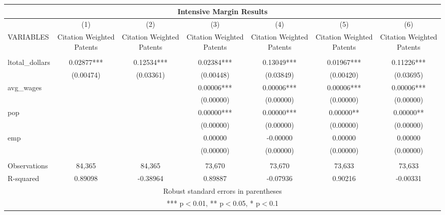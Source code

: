 \documentclass[]{article}
\begin{document}
\begin{tabular}{lcccccc}
\multicolumn{7}{c}{Intensive Margin Results} \\ \hline
 & (1) & (2) & (3) & (4) & (5) & (6) \\
VARIABLES & Citation Weighted Patents & Citation Weighted Patents & Citation Weighted Patents & Citation Weighted Patents & Citation Weighted Patents & Citation Weighted Patents \\ \hline
 &  &  &  &  &  &  \\
ltotal\_dollars & 0.02877*** & 0.12534*** & 0.02384*** & 0.13049*** & 0.01967*** & 0.11226*** \\
 & (0.00474) & (0.03361) & (0.00448) & (0.03849) & (0.00420) & (0.03695) \\
avg\_wages &  &  & 0.00006*** & 0.00006*** & 0.00006*** & 0.00006*** \\
 &  &  & (0.00000) & (0.00000) & (0.00000) & (0.00000) \\
pop &  &  & 0.00000*** & 0.00000*** & 0.00000** & 0.00000** \\
 &  &  & (0.00000) & (0.00000) & (0.00000) & (0.00000) \\
emp &  &  & 0.00000 & -0.00000 & 0.00000 & 0.00000 \\
 &  &  & (0.00000) & (0.00000) & (0.00000) & (0.00000) \\
 &  &  &  &  &  &  \\
Observations & 84,365 & 84,365 & 73,670 & 73,670 & 73,633 & 73,633 \\
 R-squared & 0.89098 & -0.38964 & 0.89887 & -0.07936 & 0.90216 & -0.00331 \\ \hline
\multicolumn{7}{c}{ Robust standard errors in parentheses} \\
\multicolumn{7}{c}{ *** p$<$0.01, ** p$<$0.05, * p$<$0.1} \\
\end{tabular}
\end{document}
